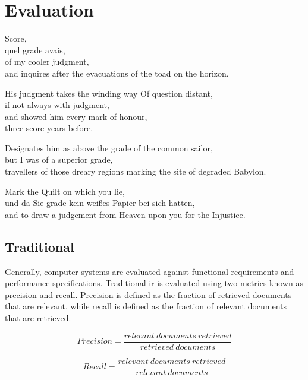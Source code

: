 
\chapter{Evaluation}
\label{ch:evaluation}

\startcontents[chapters]

Score, \\
quel grade avais, \\
of my cooler judgment, \\
and inquires after the evacuations of the toad on the horizon.

His judgment takes the winding way Of question distant, \\
if not always with judgment, \\
and showed him every mark of honour, \\
three score years before.

Designates him as above the grade of the common sailor, \\
but I was of a superior grade, \\
travellers of those dreary regions marking the site of degraded Babylon.

Mark the Quilt on which you lie, \\
und da Sie grade kein weißes Papier bei sich hatten, \\
and to draw a judgement from Heaven upon you for the Injustice.

\minicontents


\section{Traditional}

Generally, computer systems are evaluated against functional requirements and performance specifications. Traditional \gls{ir} is evaluated using two metrics known as precision and recall. Precision is defined as the fraction of retrieved documents that are relevant, while recall is defined as the fraction of relevant documents that are retrieved.

\begin{equation}
  Precision = \frac{relevant \ documents \ retrieved}{retrieved \ documents}
  \label{eq:precision}
\end{equation}

\begin{equation}
  Recall = \frac{relevant \ documents \ retrieved}{relevant \ documents}
\label{eq:recall}
\end{equation}

